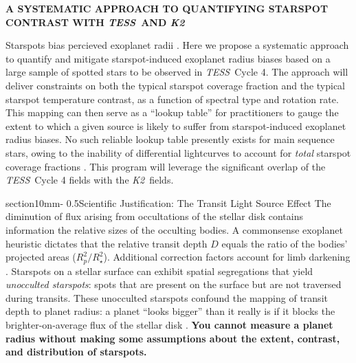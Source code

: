 \documentclass[letterpaper,12pt]{article}
\makeatletter
\renewcommand{\section}{\@startsection%
{section}{1}{0mm}{-\baselineskip}%
{0.5\baselineskip}{\normalfont\Large\bfseries}}%
\newcommand{\tess}{{\it TESS}}
\newcommand{\ktwo}{{\it K2}}
\makeatother
\begin{document}
\pagestyle{plain}



\begin{center}
\bfseries\uppercase{%
A systematic approach to quantifying starspot contrast with \tess\ and \ktwo
}
\end{center}



Starspots bias percieved exoplanet radii \cite{2018ApJ...853..122R}.  Here we propose a systematic approach to quantify and mitigate starspot-induced exoplanet radius biases based on a large sample of spotted stars to be observed in \tess\ Cycle 4.  The approach will deliver constraints on both the typical starspot coverage fraction and the typical starspot temperature contrast, as a function of spectral type and rotation rate.  This mapping can then serve as a ``lookup table'' for practitioners to gauge the extent to which a given source is likely to suffer from starspot-induced exoplanet radius biases.  No such reliable lookup table presently exists for main sequence stars, owing to the inability of differential lightcurves to account for \emph{total} starspot coverage fractions \cite{2018ApJ...865..142B}.  This program will leverage the significant overlap of the \tess\ Cycle 4 fields with the \ktwo\ fields.

\section{Scientific Justification: The Transit Light Source Effect}
The diminution of flux arising from occultations of the stellar disk contains information the relative sizes of the occulting bodies.  A commonsense exoplanet heuristic dictates that the relative transit depth $D$ equals the ratio of the bodies' projected areas ($R_p^2/R_\star^2$).  Additional correction factors account for limb darkening \cite{2002ApJ...580L.171M}.  Starspots on a stellar surface can exhibit spatial segregations
that yield \emph{unocculted starspots}: spots that are present on the surface but are not traversed during transits.  These unocculted starspots confound the mapping of transit depth to planet radius: a planet ``looks bigger'' than it really is if it blocks the brighter-on-average flux of the stellar disk \cite{2018AJ....156...91M}.  \textbf{You cannot measure a planet radius without making some assumptions about the extent, contrast, and distribution of starspots.}
\end{document}

